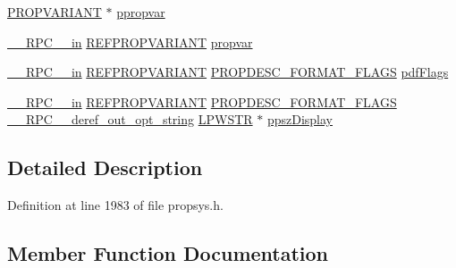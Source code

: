 \begin{DoxyCompactItemize}
\item 
\hyperlink{propidl_8h_ae902c1757cd16052896846fa4ebb88d8}{P\+R\+O\+P\+V\+A\+R\+I\+A\+NT} $\ast$ \hyperlink{struct_i_property_description_alias_info_vtbl_a9e66742960c77ffcb2c8fe3941f9418f}{ppropvar}
\item 
\hyperlink{rpcsal_8h_a20b7f6da600a05c8b541659f14f7f0e6}{\+\_\+\+\_\+\+R\+P\+C\+\_\+\+\_\+in} \hyperlink{propidl_8h_ac8a8bd0f5f7f9b7e9f8e6fd4fd039fda}{R\+E\+F\+P\+R\+O\+P\+V\+A\+R\+I\+A\+NT} \hyperlink{struct_i_property_description_alias_info_vtbl_a5ead054ffec6a5fef18270c10f8dcdc6}{propvar}
\item 
\hyperlink{rpcsal_8h_a20b7f6da600a05c8b541659f14f7f0e6}{\+\_\+\+\_\+\+R\+P\+C\+\_\+\+\_\+in} \hyperlink{propidl_8h_ac8a8bd0f5f7f9b7e9f8e6fd4fd039fda}{R\+E\+F\+P\+R\+O\+P\+V\+A\+R\+I\+A\+NT} \hyperlink{propsys_8h_a2aebc32bcab5d49a6377d14902ec66e2}{P\+R\+O\+P\+D\+E\+S\+C\+\_\+\+F\+O\+R\+M\+A\+T\+\_\+\+F\+L\+A\+GS} \hyperlink{struct_i_property_description_alias_info_vtbl_a2c33ca1d06663dac60d5858cdcc7657d}{pdf\+Flags}
\item 
\hyperlink{rpcsal_8h_a20b7f6da600a05c8b541659f14f7f0e6}{\+\_\+\+\_\+\+R\+P\+C\+\_\+\+\_\+in} \hyperlink{propidl_8h_ac8a8bd0f5f7f9b7e9f8e6fd4fd039fda}{R\+E\+F\+P\+R\+O\+P\+V\+A\+R\+I\+A\+NT} \hyperlink{propsys_8h_a2aebc32bcab5d49a6377d14902ec66e2}{P\+R\+O\+P\+D\+E\+S\+C\+\_\+\+F\+O\+R\+M\+A\+T\+\_\+\+F\+L\+A\+GS} \hyperlink{rpcsal_8h_a8117c8d086bbc250c5117e81dc347263}{\+\_\+\+\_\+\+R\+P\+C\+\_\+\+\_\+deref\+\_\+out\+\_\+opt\+\_\+string} \hyperlink{mapinls_8h_acc28f72b93422cfd63a60e5a102a77b1}{L\+P\+W\+S\+TR} $\ast$ \hyperlink{struct_i_property_description_alias_info_vtbl_a9992ed596e47d805a69c2c56f0c689a2}{ppsz\+Display}
\end{DoxyCompactItemize}


\subsection{Detailed Description}


Definition at line 1983 of file propsys.\+h.



\subsection{Member Function Documentation}
